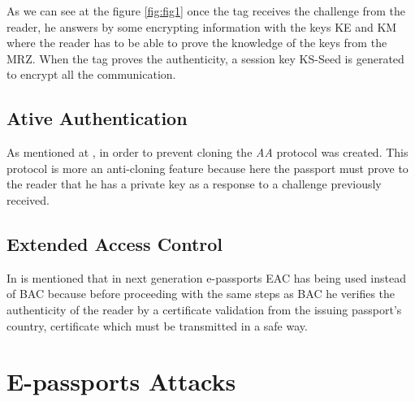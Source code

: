 \documentclass{acm_proc_article-sp}
\begin{document}
As we can see at the figure \ref{fig:fig1} once the tag receives the challenge from the reader, he answers 
by some encrypting information with the keys KE and KM where the reader has to be able to prove the 
knowledge of the keys from the MRZ. When the tag proves the authenticity, a session key KS-Seed 
is generated to encrypt all the communication.

\subsection{Ative Authentication}
As mentioned at \cite{JUAR2005}, in order to prevent cloning the \textit{AA} protocol was created. 
This protocol is more an anti-cloning feature because here the passport must prove 
to the reader that he has a private key as a response to a challenge previously received.

\subsection{Extended Access Control}
In \cite{NM12} is mentioned that in next generation e-passports EAC has being used 
instead of BAC because before proceeding with the same steps as BAC he verifies the 
authenticity of the reader by a certificate validation from the issuing passport’s country, 
certificate which must be transmitted in a safe way.


\section{E-passports Attacks}
\label{sec:sec3}
\end{document}
